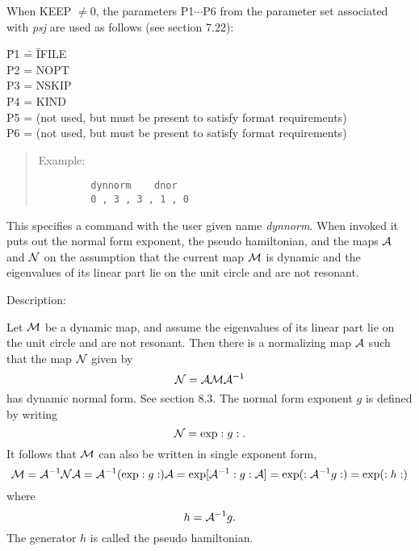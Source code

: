 When KEEP $\neq 0$, the parameters P1$\cdots$P6 from the parameter set associated
with {\em psj } are used as follows (see section 7.22):
\begin{tabbing}
\indent \=P1 \= = \= IFILE\\
        \>P2 \> = \> NOPT\\
        \>P3 \> = \> NSKIP\\
        \>P4 \> = \> KIND\\
        \>P5 \> =  (not used, but must be present to satisfy format requirements)\\
        \>P6 \> =  (not used, but must be present to satisfy format requirements)
\end{tabbing}

\vspace{5mm}
\begin{quotation}
\noindent Example:
\begin{verbatim}
         dynnorm    dnor
         0 , 3 , 3 , 1 , 0
\end{verbatim}
\end{quotation}
This specifies a command with the user given name {\em dynnorm}.  When invoked it puts out the normal form exponent, the pseudo hamiltonian, and the maps ${\cal A}$ and ${\cal N}$ on the assumption that the current map ${\cal M}$ is dynamic and the eigenvalues of its linear part lie on the unit circle and are not resonant.

\vspace{5mm}
     Description:
\vspace{2mm}

Let ${\cal M}$ be a dynamic map, and assume the eigenvalues of its linear part lie on the unit circle and are not resonant.  Then there is a normalizing map ${\cal A}$ such that the map ${\cal N}$ given by
\[
{\cal N} = {\cal A} {\cal M} {\cal A}^{-1}
\]
has dynamic normal form.  See section 8.3.  The normal form exponent $g$ is defined by writing
\[
{\cal N} = \exp :g:.
\]
It follows that ${\cal M}$ can also be written in single exponent form,
\[
{\cal M} = {\cal A}^{-1} {\cal N} {\cal A} = {\cal A}^{-1} (\exp :g:) {\cal A} = \exp [{\cal A}^{-1} :g:{\cal A}] = \exp (:{\cal A}^{-1} g:) = \exp (:h:)
\]
where
\[
h = {\cal A}^{-1} g.
\]
The generator $h$ is called the pseudo hamiltonian.

